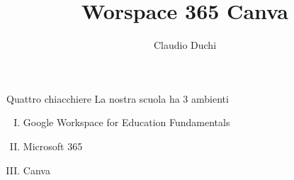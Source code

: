 \documentclass{beamer}
\title{Worspace 365 Canva}
\author{Claudio Duchi}
\begin{document}
\begin{frame}[plain]
    \maketitle
\end{frame}
\begin{frame}{Quattro chiacchiere}
	La nostra scuola ha 3 ambienti 
	\begin{enumerate}[(I)]
		\item<1-> Google Workspace for Education Fundamentals
		\item<2-> Microsoft 365
		\item<3-> Canva
	\end{enumerate}
\end{frame}
\end{document}
